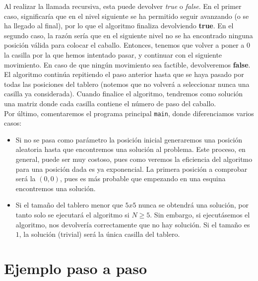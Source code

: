 \documentclass[11pt]{article}
\begin{document}
Al realizar la llamada recursiva, esta puede devolver \textit{true} o \textit{false}. En el primer caso, significaría que en el nivel siguiente se  ha permitido seguir avanzando (o se ha llegado al final), por lo que el algoritmo finaliza devolviendo \textbf{true}. En el segundo caso, la razón sería que en el siguiente nivel no se ha encontrado ninguna posición válida para colocar el caballo. Entonces, tenemos que volver a poner a $0$ la casilla por la que hemos intentado pasar, y continuar con el siguiente movimiento. En caso de que ningún movimiento sea factible, devolveremos \textbf{false}.\\

El algoritmo continúa repitiendo el paso anterior hasta que se haya pasado por todas las posiciones del tablero (notemos que no volverá a seleccionar nunca una casilla ya considerada). Cuando finalice el algoritmo, tendremos como solución una matriz donde cada casilla contiene el número de paso del caballo.\\




Por último, comentaremos el programa principal \verb|main|, donde diferenciamos varios casos:
\begin{itemize}
	\item Si no se pasa como parámetro la posición inicial generaremos una posición aleatoria hasta que encontremos una solución al problema. Este proceso, en general, puede ser muy costoso, pues como veremos la eficiencia del algoritmo para una posición dada es ya exponencial. La primera posición a comprobar será la $(0,0)$, pues es más probable que empezando en una esquina encontremos una solución.
	\item Si el tamaño del tablero menor que $5x5$ nunca se obtendrá una solución, por tanto solo se ejecutará el algoritmo si $N\ge5$. Sin embargo, si ejecutásemos el algoritmo, nos devolvería correctamente que no hay solución. Si el tamaño es $1$, la solución (trivial) será la única casilla del tablero. 
\end{itemize}


\section*{Ejemplo paso a paso}

\end{document}
